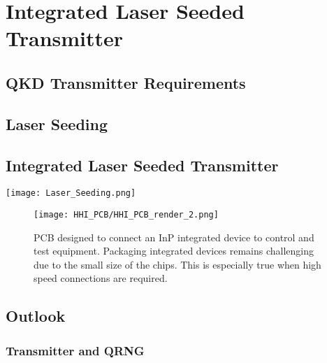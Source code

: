 %
%
\graphicspath{{./chapters/chapter06/fig06/}}

\let\textcircled=\pgftextcircled
\chapter{Integrated Laser Seeded Transmitter}
\label{chap:laser-seeding}

\section{QKD Transmitter Requirements}
\label{sec:sec06}

\section{Laser Seeding}

\section{Integrated Laser Seeded Transmitter}

\begin{sidewaysfigure}
	\texttt{[image: Laser\_Seeding.png]}
	\caption[InP laser seeding transmitter with QRNG]{This shows the layout of the laser seeded transmitter device fabricated by HHI. The chip measures \SI[product-units=power]{6x4}{mm} and contains two laser seeding prototype circuits, a homodyne \ac{qrng} and test structure to measure laser and waveguide performances. This demonstrates the complexity and compactness possible in the integrated platform.}
	\label{fig:hhi_laser_seeding}
\end{sidewaysfigure}

\begin{figure}[tbp]
	\texttt{[image: HHI\_PCB/HHI\_PCB\_render\_2.png]}
	\caption[PCB breakout for an InP integrated circuit]{PCB designed to connect an \ac{InP} integrated device to control and test equipment. Packaging integrated devices remains challenging due to the small size of the chips. This is especially true when high speed connections are required.}
	\label{fig:hhi_pcb}
\end{figure}

\section{Outlook}

\subsection{Transmitter and QRNG}

